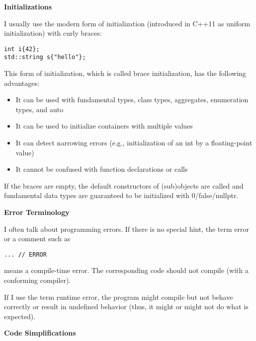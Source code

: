\hspace*{\fill} \par %
\textbf{Initializations}

I usually use the modern form of initialization (introduced in C++11 as uniform initialization) with curly braces:\par
\begin{lstlisting}[caption={}]
int i{42};
std::string s{"hello"};
\end{lstlisting}

This form of initialization, which is called brace initialization, has the following advantages: \par
\begin{itemize}
	\item It can be used with fundamental types, class types, aggregates, enumeration types, and auto
	\item It can be used to initialize containers with multiple values
	\item It can detect narrowing errors (e.g., initialization of an int by a floating-point value)
	\item It cannot be confused with function declarations or calls
\end{itemize}

If the braces are empty, the default constructors of (sub)objects are called and fundamental data types are guaranteed to be initialized with 0/false/nullptr.\par

\hspace*{\fill} \par %
\textbf{Error Terminology}

I often talk about programming errors. If there is no special hint, the term error or a comment such as\par
\begin{lstlisting}[caption={}]
... // ERROR
\end{lstlisting}
means a compile-time error. The corresponding code should not compile (with a conforming compiler).\par

If I use the term runtime error, the program might compile but not behave correctly or result in undefined behavior (thus, it might or might not do what is expected).\par

\hspace*{\fill} \par %
\textbf{Code Simplifications}

